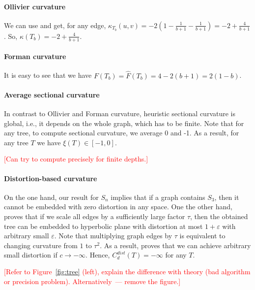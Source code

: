\documentclass{article} %
\begin{document}
\paragraph{Ollivier curvature} We can use  and get, for any edge,
$\kappa_{T_b}(u,v) = -2 \left(1 - \frac{1}{b+1} - \frac{1}{b+1} \right) = - 2 + \frac{4}{b+1}$. So, $\kappa(T_b) = -2 + \frac{4}{b+1}$.

\paragraph{Forman curvature} 
It is easy to see that we have 
$F(T_b) = \hat F(T_b) = 4 - 2(b+1) = 2(1-b)$.


\paragraph{Average sectional curvature} In contrast to Ollivier and Forman curvature, heuristic sectional curvature is global, i.e., it depends on the whole graph, which has to be finite. Note that for any tree, to compute sectional curvature, we average 0 and -1. As a result, for any tree $T$ we have $\xi(T) \in [-1,0]$. 

\textcolor{red}{[Can try to compute precisely for finite depths.]}

\paragraph{Distortion-based curvature} 

On the one hand, our result for $S_n$ implies that if a graph contains $S_3$, then it cannot be embedded with zero distortion in any space. One the other hand, \citet{sarkar2011low} proves that if we scale all edges by a sufficiently large factor $\tau$, then the obtained tree can be embedded to hyperbolic plane with distortion at most $1 + \varepsilon$ with arbitrary small $\varepsilon$. Note that multiplying graph edges by $\tau$ is equivalent to changing curvature from $1$ to $\tau^2$. As a result, \citet{sarkar2011low} proves that we can achieve arbitrary small distortion if $c \to -\infty$.
Hence, $C_d^{dist}(T) = -\infty$ for any $T$.

\textcolor{red}{[Refer to Figure~\ref{fig:tree} (left), explain the difference with theory (bad algorithm or precision problem). Alternatively~--- remove the figure.]}
\end{document}
